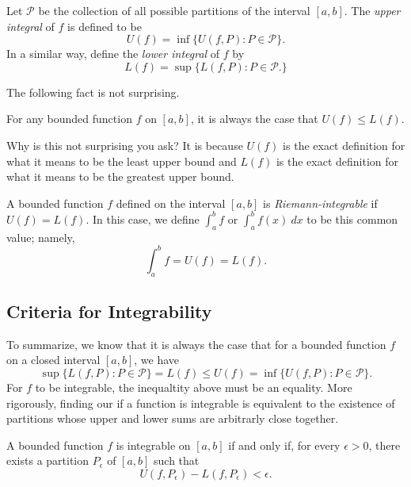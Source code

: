 \begin{definition}
	Let \( \mathcal{P}  \) be the collection of all possible partitions of the interval \( [a,b] \). The \textit{upper integral} of \( f \) is defined to be 
	\[  U(f) = \inf \{ U(f,P) : P \in \mathcal{P} \}.  \]
	In a similar way, define the \textit{lower integral} of \( f  \) by 
	\[  L(f) = \sup \{ L(f,P) : P \in \mathcal{P}. \}  \]
\end{definition}
 The following fact is not surprising. 

 \begin{lemma}
	For any bounded function \( f  \) on \( [a,b]  \), it is always the case that \( U(f) \leq L(f) \).
\end{lemma}

Why is this not surprising you ask? It is because \( U(f) \) is the exact definition for what it means to be the least upper bound and \( L(f)  \) is the exact definition for what it means to be the greatest upper bound.

\begin{definition}
	A bounded function \( f  \) defined on the interval \( [a,b] \) is \textit{Riemann-integrable} if \( U(f) = L(f) \). In this case, we define \( \int_{ a }^{ b } f   \) or \( \int_{ a }^{ b } f(x) \ dx \) to be this common value; namely, 
	\[  \int_{ a }^{ b } f  = U(f) = L(f). \]
\end{definition}

\subsection{Criteria for Integrability} 

To summarize, we know that it is always the case that for a bounded function  \( f  \) on a closed interval \( [a,b]  \), we have 
\[  \sup \{ L(f,P) : P \in \mathcal{P} \} = L(f) \leq U(f) = \inf \{ U(f,P) : P \in \mathcal{P} \}.\] For \( f  \) to be integrable, the inequaltity above must be an equality. More rigorously, finding our if a function is integrable is equivalent to the existence of partitions whose upper and lower sums are arbitrarly close together.

\begin{theorem}
		A bounded function \(  f \) is integrable on \( [a,b]  \) if and only if, for every \( \epsilon > 0  \), there exists a partition \( P_{\epsilon } \) of \( [a,b] \) such that 
		\[  U(f, P_{\epsilon }) - L(f, P_{\epsilon }) < \epsilon. \]
	\end{theorem}

